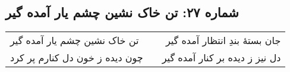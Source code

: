 \begin{center}
\section*{شماره ۲۷: تن خاک نشین چشم یار آمده گیر}
\label{sec:027}
\begin{longtable}{l p{0.5cm} r}
تن خاک نشین چشم یار آمده گیر
&&
جان بستهٔ بندِ انتظار آمده گیر
\\
چون دیده ز خون دل کنارم پر کرد
&&
دل نیز ز دیده بر کنار آمده گیر
\\
\end{longtable}
\end{center}
